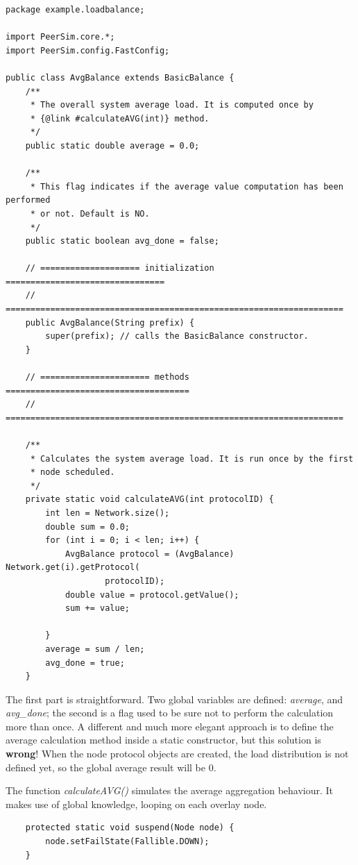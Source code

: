 \documentclass[a4paper,11pt]{article}
\begin{document}
\footnotesize
\begin{verbatim}
package example.loadbalance;

import PeerSim.core.*;
import PeerSim.config.FastConfig;

public class AvgBalance extends BasicBalance {
    /**
     * The overall system average load. It is computed once by
     * {@link #calculateAVG(int)} method.
     */
    public static double average = 0.0;

    /**
     * This flag indicates if the average value computation has been performed
     * or not. Default is NO.
     */
    public static boolean avg_done = false;

    // ==================== initialization ================================
    // ====================================================================
    public AvgBalance(String prefix) {
        super(prefix); // calls the BasicBalance constructor.
    }

    // ====================== methods =====================================
    // ====================================================================

    /**
     * Calculates the system average load. It is run once by the first
     * node scheduled. 
     */
    private static void calculateAVG(int protocolID) {
        int len = Network.size();
        double sum = 0.0;
        for (int i = 0; i < len; i++) {
            AvgBalance protocol = (AvgBalance) Network.get(i).getProtocol(
                    protocolID);
            double value = protocol.getValue();
            sum += value;

        }
        average = sum / len;
        avg_done = true;
    }
\end{verbatim}
\normalsize


The first part is straightforward. Two global variables are defined:
\emph{average}, and \emph{avg\_done}; the second is a flag used to be
sure not to
perform the calculation more than once. A different and much more
elegant approach is to define the average calculation method inside
a static constructor, but this solution is \textbf{wrong}! When the
node protocol objects are created, the load distribution is not defined
yet, so the global average result will be 0.

The function \emph{calculateAVG()} simulates the average aggregation
behaviour. It makes use of global knowledge, looping on each overlay
node. 

\footnotesize
\begin{verbatim}
    protected static void suspend(Node node) {
        node.setFailState(Fallible.DOWN);
    }
\end{verbatim}
\normalsize
\end{document}

